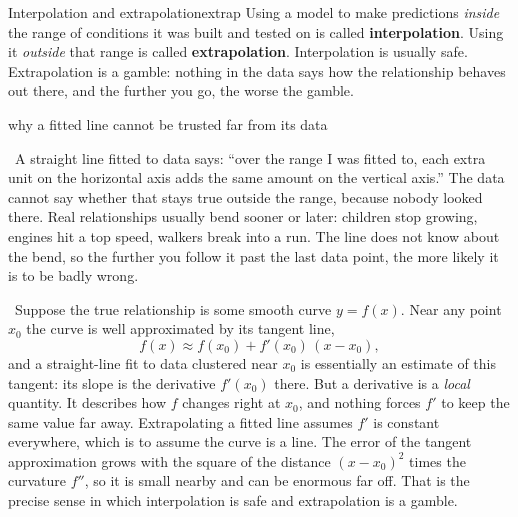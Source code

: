 \documentclass[11pt,twoside,openany]{book}
\newcommand{\viewtag}[3]{\fcolorbox{#2}{#3}{\footnotesize\textbf{\textcolor{#2}{#1}}}}
\newcommand{\elemtag}{\viewtag{Elementary}{elemcol}{elempale}}
\newcommand{\calctag}{\viewtag{Calculus}{calccol}{calcpale}}
\newcommand{\elem}{\par\medskip\noindent\elemtag\ }
\newcommand{\calc}{\par\medskip\noindent\calctag\ }
\begin{document}
\begin{definition}{Interpolation and extrapolation}{extrap}
Using a model to make predictions \emph{inside} the range of conditions it was built and tested on is called \textbf{interpolation}. Using it \emph{outside} that range is called \textbf{extrapolation}. Interpolation is usually safe. Extrapolation is a gamble: nothing in the data says how the relationship behaves out there, and the further you go, the worse the gamble.
\end{definition}

\begin{twoviews}{why a fitted line cannot be trusted far from its data}
\elem A straight line fitted to data says: ``over the range I was fitted to, each extra unit on the horizontal axis adds the same amount on the vertical axis.'' The data cannot say whether that stays true outside the range, because nobody looked there. Real relationships usually bend sooner or later: children stop growing, engines hit a top speed, walkers break into a run. The line does not know about the bend, so the further you follow it past the last data point, the more likely it is to be badly wrong.

\calc Suppose the true relationship is some smooth curve $y = f(x)$. Near any point $x_0$ the curve is well approximated by its tangent line,
\[
f(x) \approx f(x_0) + f'(x_0)\,(x - x_0),
\]
and a straight-line fit to data clustered near $x_0$ is essentially an estimate of this tangent: its slope is the derivative $f'(x_0)$ there. But a derivative is a \emph{local} quantity. It describes how $f$ changes right at $x_0$, and nothing forces $f'$ to keep the same value far away. Extrapolating a fitted line assumes $f'$ is constant everywhere, which is to assume the curve is a line. The error of the tangent approximation grows with the square of the distance $(x - x_0)^2$ times the curvature $f''$, so it is small nearby and can be enormous far off. That is the precise sense in which interpolation is safe and extrapolation is a gamble.
\end{twoviews}
\end{document}
